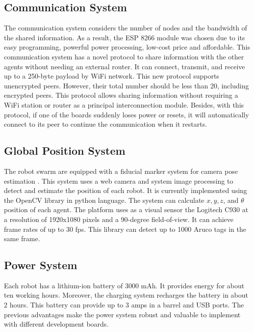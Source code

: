 \subsection{Communication System}
The communication system considers the number of nodes and the bandwidth of the shared information. As a result, the ESP 8266 module was chosen due to its easy programming, powerful power processing, low-cost price and affordable. This communication system has a novel protocol to share information with the other agents without needing an external router. It can connect, transmit, and receive up to a 250-byte payload by WiFi network. This new protocol supports unencrypted peers. However, their total number should be less than 20, including encrypted peers. This protocol allows sharing information without requiring a WiFi station or router as a principal interconnection module. Besides, with this protocol, if one of the boards suddenly loses power or resets, it will automatically connect to its peer to continue the communication when it restarts. 

\subsection{Global Position System}
\label{GPS}
The robot swarm are equipped with a fiducial marker system for camera pose estimation \cite{aruco}. This system uses a web camera and system image processing to detect and estimate the position of each robot. It is currently implemented using the OpenCV library in python language. The system can calculate $x,y,z$, and $\theta$ position of each agent. The platform uses as a visual sensor the Logitech C930 at a resolution of 1920x1080 pixels and a 90-degree field-of-view. It can achieve frame rates of up to 30 fps. This library can detect up to 1000 Aruco tags in the same frame.

\subsection{Power System}
Each robot has a lithium-ion battery of 3000 mAh. It provides energy for about ten working hours. Moreover, the charging system recharges the battery in about 2 hours. This battery can provide up to 3 amps in a barrel and USB ports. The previous advantages make the power system robust and valuable to implement with different development boards. 


